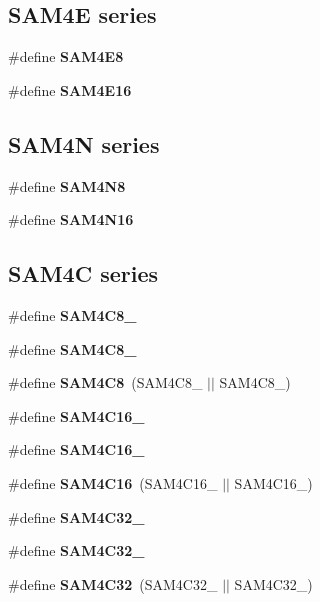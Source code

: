 \subsection*{S\-A\-M4\-E series}
\begin{DoxyCompactItemize}
\item 
\#define {\bfseries S\-A\-M4\-E8}
\item 
\#define {\bfseries S\-A\-M4\-E16}
\end{DoxyCompactItemize}
\subsection*{S\-A\-M4\-N series}
\begin{DoxyCompactItemize}
\item 
\#define {\bfseries S\-A\-M4\-N8}
\item 
\#define {\bfseries S\-A\-M4\-N16}
\end{DoxyCompactItemize}
\subsection*{S\-A\-M4\-C series}
\begin{DoxyCompactItemize}
\item 
\#define {\bfseries S\-A\-M4\-C8\-\_}
\item 
\#define {\bfseries S\-A\-M4\-C8\-\_}
\item 
\hypertarget{group__sam__part__macros__group_ga8a05a38838ed43d62f89266155741aeb}{\#define {\bfseries S\-A\-M4\-C8}~(S\-A\-M4\-C8\-\_ $|$$|$ S\-A\-M4\-C8\-\_)}\label{group__sam__part__macros__group_ga8a05a38838ed43d62f89266155741aeb}

\item 
\#define {\bfseries S\-A\-M4\-C16\-\_}
\item 
\#define {\bfseries S\-A\-M4\-C16\-\_}
\item 
\hypertarget{group__sam__part__macros__group_ga74d1bd22ed59bc6a2c34d9d723332931}{\#define {\bfseries S\-A\-M4\-C16}~(S\-A\-M4\-C16\-\_ $|$$|$ S\-A\-M4\-C16\-\_)}\label{group__sam__part__macros__group_ga74d1bd22ed59bc6a2c34d9d723332931}

\item 
\#define {\bfseries S\-A\-M4\-C32\-\_}
\item 
\#define {\bfseries S\-A\-M4\-C32\-\_}
\item 
\hypertarget{group__sam__part__macros__group_ga4db5c63ded057f50bd4359538bc1299f}{\#define {\bfseries S\-A\-M4\-C32}~(S\-A\-M4\-C32\-\_ $|$$|$ S\-A\-M4\-C32\-\_)}\label{group__sam__part__macros__group_ga4db5c63ded057f50bd4359538bc1299f}

\end{DoxyCompactItemize}
